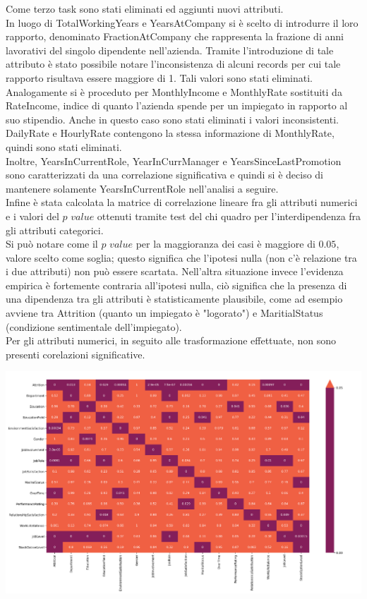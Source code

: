 \documentclass[a4paper,9pt]{article}
\begin{document}
Come terzo task sono stati eliminati ed aggiunti nuovi attributi.\\
In luogo di TotalWorkingYears e YearsAtCompany si è scelto di introdurre il loro rapporto, denominato FractionAtCompany che rappresenta la frazione di anni lavorativi del singolo dipendente nell'azienda. Tramite l'introduzione di tale attributo è stato possibile notare l'inconsistenza di alcuni records per cui tale rapporto risultava essere maggiore di 1. Tali valori sono stati eliminati. Analogamente si è proceduto per MonthlyIncome e MonthlyRate sostituiti da RateIncome, indice di quanto l'azienda spende per un impiegato in rapporto al suo stipendio. Anche in questo caso sono stati eliminati i valori inconsistenti.\\ 
DailyRate e HourlyRate contengono la stessa informazione di MonthlyRate, quindi sono stati eliminati.\\
Inoltre, YearsInCurrentRole, YearInCurrManager e YearsSinceLastPromotion sono caratterizzati da una correlazione significativa e quindi si è deciso di mantenere solamente YearsInCurrentRole nell'analisi a seguire.\\
Infine è stata calcolata la matrice di correlazione lineare fra gli attributi numerici e i valori del $p $ $value$  ottenuti tramite test del chi quadro per l'interdipendenza fra gli attributi categorici.\\
Si può notare come il $p$ $ value$ per la maggioranza dei casi è maggiore di $0.05$, valore scelto come soglia; questo significa che l'ipotesi nulla (non c'è relazione tra i due attributi) non può essere scartata. Nell'altra situazione invece l'evidenza empirica è fortemente contraria all'ipotesi nulla, ciò significa che la presenza di una dipendenza tra gli attributi è statisticamente plausibile, come ad esempio avviene tra Attrition (quanto un impiegato è "logorato") e MaritialStatus (condizione sentimentale dell'impiegato).\\
Per gli attributi numerici, in seguito alle trasformazione effettuate, non sono presenti corelazioni significative.

\begin{center}
\includegraphics[scale=1.2]{mccat.png}
\end{center}
\end{document}
